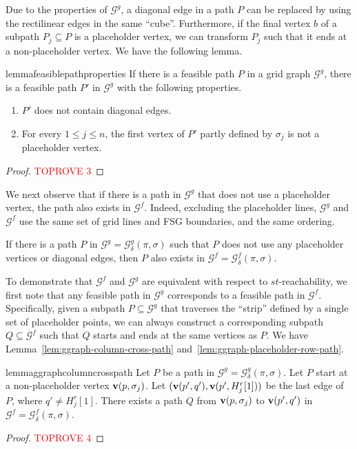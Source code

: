 \documentclass[thm-restate]{lipics-v2021}
\theoremstyle{remark}
\newcommand{\graph}[0]{\mathcal{G}}
\newcommand{\doublequote}[1]{``#1''}
\newcommand{\vertex}[1]{\normalfont \textbf{v}(#1)}
\newcommand{\fsgraph}[0]{\graph^{f}}
\newcommand{\ggraph}[0]{\graph^g}
\begin{document}
Due to the properties of $\ggraph$, a diagonal edge in a path $P$ can be replaced by using the rectilinear edges in the same \doublequote{cube}. Furthermore, if the final vertex $b$ of a subpath $P_j \subseteq P$ is a placeholder vertex, we can transform $P_j$ such that it ends at a non-placeholder vertex. We have the following lemma. 

\begin{restatable}{lemma}{feasiblepathproperties} \label{lem:feasible-path-properties}
    If there is a feasible path $P$ in a grid graph $\ggraph$, there is a feasible path $P'$ in $\ggraph$ with the following properties. 
    \begin{enumerate}
        \item $P'$ does not contain diagonal edges. 
        \item For every $1 \leq j \leq n$, the first vertex of $P'$ partly defined by $\sigma_j$ is not a placeholder vertex.
    \end{enumerate}    
\end{restatable}
\begin{proof}\textcolor{red}{TOPROVE 3}\end{proof}

We next observe that if there is a path in $\ggraph$ that does not use a placeholder vertex, the path also exists in $\fsgraph$. Indeed, excluding the placeholder lines, $\ggraph$ and $\fsgraph$ use the same set of grid lines and FSG boundaries, and the same ordering. 
\begin{observation} \label{obs:gg-fs-path-in-a-cell}
    If there is a path $P$ in $\ggraph = \ggraph_\delta(\pi, \sigma)$ such that $P$ does not use any placeholder vertices or diagonal edges, then $P$ also exists in $\fsgraph = \fsgraph_\delta(\pi, \sigma)$. 
\end{observation}

To demonstrate that $\fsgraph$ and $\ggraph$ are equivalent with respect to $st$-reachability, we first note that any feasible path in $\ggraph$ corresponds to a feasible path in $\fsgraph$. Specifically, given a subpath $P \subseteq \ggraph$ that traverses the \doublequote{strip} defined by a single set of placeholder points, we can always construct a corresponding subpath $Q \subseteq \fsgraph$ such that $Q$ starts and ends at the same vertices as $P$. We have Lemma~\ref{lem:ggraph-column-cross-path} and~\ref{lem:ggraph-placeholder-row-path}. 

\begin{restatable}{lemma}{ggraphcolumncrosspath} \label{lem:ggraph-column-cross-path}
    Let $P$ be a path in $\ggraph = \ggraph_{\delta}(\pi, \sigma)$. Let $P$ start at a non-placeholder vertex $\vertex{p, \sigma_j}$. Let $(\vertex{p', q'}, \vertex{p', H^r_j[1]})$ be the last edge of $P$, where $q' \neq H^r_j[1]$. There exists a path $Q$ from $\vertex{p, \sigma_j}$ to $\vertex{p', q'}$ in $\fsgraph = \fsgraph_{\delta}(\pi, \sigma)$.  
\end{restatable}
\begin{proof}\textcolor{red}{TOPROVE 4}\end{proof}
\end{document}
